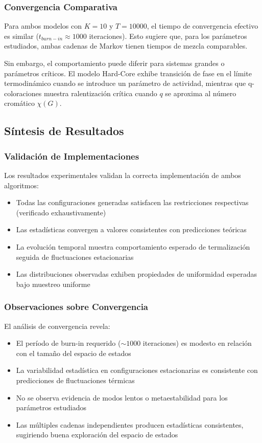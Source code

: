 \subsubsection{Convergencia Comparativa}

Para ambos modelos con $K=10$ y $T=10000$, el tiempo de convergencia efectivo es similar ($t_{burn-in} \approx 1000$ iteraciones). Esto sugiere que, para los parámetros estudiados, ambas cadenas de Markov tienen tiempos de mezcla comparables.

Sin embargo, el comportamiento puede diferir para sistemas grandes o parámetros críticos. El modelo Hard-Core exhibe transición de fase en el límite termodinámico cuando se introduce un parámetro de actividad, mientras que q-coloraciones muestra ralentización crítica cuando $q$ se aproxima al número cromático $\chi(G)$.

\subsection{Síntesis de Resultados}

\subsubsection{Validación de Implementaciones}

Los resultados experimentales validan la correcta implementación de ambos algoritmos:

\begin{itemize}
\item Todas las configuraciones generadas satisfacen las restricciones respectivas (verificado exhaustivamente)
\item Las estadísticas convergen a valores consistentes con predicciones teóricas
\item La evolución temporal muestra comportamiento esperado de termalización seguida de fluctuaciones estacionarias
\item Las distribuciones observadas exhiben propiedades de uniformidad esperadas bajo muestreo uniforme
\end{itemize}

\subsubsection{Observaciones sobre Convergencia}

El análisis de convergencia revela:

\begin{itemize}
\item El período de burn-in requerido ($\sim 1000$ iteraciones) es modesto en relación con el tamaño del espacio de estados
\item La variabilidad estadística en configuraciones estacionarias es consistente con predicciones de fluctuaciones térmicas
\item No se observa evidencia de modos lentos o metaestabilidad para los parámetros estudiados
\item Las múltiples cadenas independientes producen estadísticas consistentes, sugiriendo buena exploración del espacio de estados
\end{itemize}

